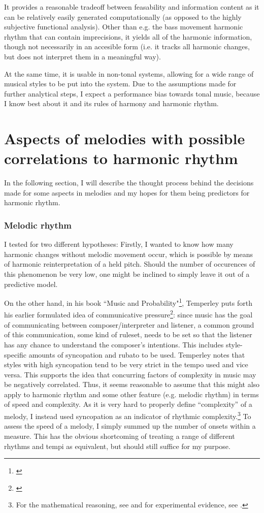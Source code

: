 \documentclass[a4paper,12pt]{report}
\begin{document}
It provides a reasonable tradeoff between feasability and information content as it can be relatively easily generated computationally (as opposed to the highly subjective functional analysis). Other than e.g. the bass movement harmonic rhythm that can contain imprecisions, it yields all of the harmonic information, though not necessarily in an accesible form (i.e. it tracks all harmonic changes, but does not interpret them in a meaningful way).

At the same time, it is usable in non-tonal systems, allowing for a wide range of musical styles to be put into the system. Due to the assumptions made for further analytical steps, I expect a performance bias towards tonal music, because I know best about it and its rules of harmony and harmonic rhythm.


\section{Aspects of melodies with possible correlations to harmonic rhythm}
In the following section, I will describe the thought process behind the decisions made for some aspects in melodies and my hopes for them being predictors for harmonic rhythm.

\subsubsection{Melodic rhythm}
I tested for two different hypotheses: Firstly, I wanted to know how many harmonic changes without melodic movement occur, which is possible by means of harmonic reinterpretation of a held pitch. Should the number of occurences of this phenomenon be very low, one might be inclined to simply leave it out of a predictive model.

On the other hand, in his book ``Music and Probability"\footnote{\cite{temperley2007music}}, Temperley puts forth his earlier formulated idea of communicative pressure\footnote{\cite{temperley2004communicative}}: since music has the goal of communicating between composer/interpreter and listener, a common ground of this communication, some kind of ruleset, needs to be set so that the listener has any chance to understand the composer's intentions. This includes style-specific amounts of syncopation and rubato to be used. Temperley notes that styles with high syncopation tend to be very strict in the tempo used and vice versa. This supports the idea that concurring factors of complexity in music may be negatively correlated. Thus, it seems reasonable to assume that this might also apply to harmonic rhythm and some other feature (e.g. melodic rhythm) in terms of speed and complexity. As it is very hard to properly define ``complexity'' of a melody, I instead used syncopation as an indicator of rhythmic complexity.\footnote{For the mathematical reasoning, see \cite{gomez2005mathematical} and for experimental evidence, see \cite{fitch2007perception}.} To assess the speed of a melody, I simply summed up the number of onsets within a measure. This has the obvious shortcoming of treating a range of different rhythms and tempi as equivalent, but should still suffice for my purpose.
\end{document}

